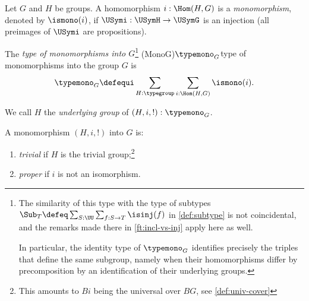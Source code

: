 \begin{definition}
  \label{def:typeofmono}
  Let $G$ and $H$ be groups. A homomorphism $i: \Hom(H,G)$ is
  a \emph{monomorphism}, denoted by $\ismono(i)$,
  if $\USymi:\USymH\to \USymG$ is an injection  
  (all preimages of $\USymi$ are propositions).
  
  The \emph{type of monomorphisms into $G$}\footnote{%
  The similarity of this type with the type of subtypes
  $\Sub_T \defeq \sum_{S:\UU}\sum_{f:S\to T}\isinj(f)$ in
  \cref{def:subtype} is not coincidental, and the remarks made 
  there in \cref{ft:incl-vs-inj} apply here as well.
  
  In particular, the identity type of $\typemono_G$
  identifies precisely the triples that define the same subgroup,
  namely when their homomorphisms differ by precomposition by an 
  identification of their underlying groups.
  
  }
  \glossary(MonoG){$\protect{\typemono_G}$}{type of monomorphisms%
  into the group $G$} 
  is
  \[
  \typemono_G\defequi\sum_{H:\typegroup}\sum_{i:\Hom(H,G)}\ismono(i).
  \]
  
  We call $H$ the \emph{underlying group} of $(H,i,!) : \typemono_G$.
  
  A monomorphism $(H,i,!)$ into $G$ is:
      \begin{enumerate}
      \item \emph{trivial} 
      if $H$ is the trivial group;\footnote{This amounts to $Bi$
      being the universal \covering over $BG$, see \cref{def:univ-cover}}
      \item \emph{proper} if $i$ is 
      not an isomorphism.\qedhere
      \end{enumerate}
\end{definition}
    
